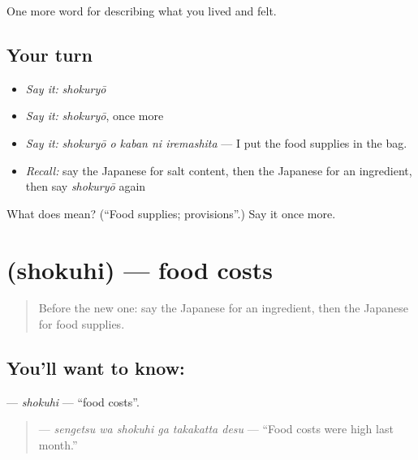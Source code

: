 \begin{grammarlens}[title={What you've built}]
One more word for describing what you lived and felt.
\end{grammarlens}

\subsection*{Your turn}
\begin{itemize}
\raggedright
  \item \emph{Say it:} \emph{shokuryō}
  \item \emph{Say it:} \emph{shokuryō}, once more
  \item \emph{Say it:} \emph{shokuryō o kaban ni iremashita} — I put the food supplies in the bag.
  \item \emph{Recall:} say the Japanese for salt content, then the Japanese for an ingredient, then say \emph{shokuryō} again
\end{itemize}

\begin{tcolorbox}[breakable,colback=teal!4,colframe=teal!35!black,title={Before you move on}]
What does  mean? (\textquotedblleft{}Food supplies; provisions\textquotedblright{}.) Say it once more.
\end{tcolorbox}
\section[\texorpdfstring{\ja{しょくひ} (shokuhi)}{しょくひ (shokuhi)}]{ (shokuhi) — food costs}

\label{lesson:JA-C497-shokuhi}



\begin{quote}
Before the new one: say the Japanese for an ingredient, then the Japanese for food supplies.
\end{quote}

\subsection*{You'll want to know: }
\textbf{} — \emph{shokuhi} — \textquotedblleft{}food costs\textquotedblright{}.

\begin{quote}
\textbf{  } — \emph{sengetsu wa shokuhi ga takakatta desu} — \textquotedblleft{}Food costs were high last month.\textquotedblright{}
\end{quote}

